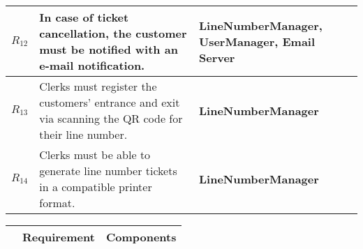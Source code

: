 \begin{table}[h]
\begin{tabular}{|p{2cm}|p{10cm}|p{4cm}|}
        $R_{12}$ & In case of ticket cancellation, the customer must be notified with an e-mail notification. & \textbf{LineNumberManager}, \textbf{UserManager}, \textbf{Email Server} \\ \hline
        $R_{13}$ & Clerks must register the customers' entrance and exit via scanning the QR code for their line number. & \textbf{LineNumberManager} \\ \hline
        $R_{14}$ & Clerks must be able to generate line number tickets in a compatible printer format. &  \textbf{LineNumberManager} \\ \hline

    \end{tabular}
\end{table}
\begin{table}[H]
    \begin{tabular}{|p{2cm}|p{10cm}|p{4cm}|}
        \hline
        & Requirement & Components \\ \hline


\end{tabular}
\end{table}
